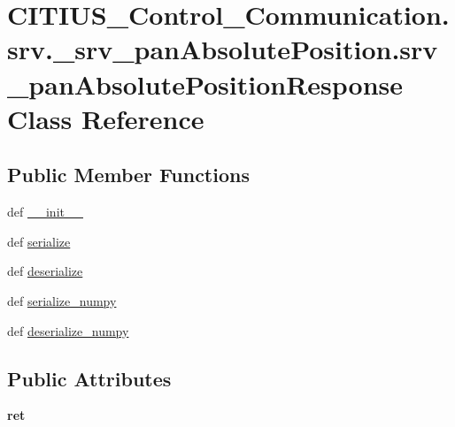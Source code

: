 \hypertarget{class_c_i_t_i_u_s___control___communication_1_1srv_1_1__srv__pan_absolute_position_1_1srv__pan_absolute_position_response}{\section{\-C\-I\-T\-I\-U\-S\-\_\-\-Control\-\_\-\-Communication.\-srv.\-\_\-srv\-\_\-pan\-Absolute\-Position.\-srv\-\_\-pan\-Absolute\-Position\-Response \-Class \-Reference}
\label{class_c_i_t_i_u_s___control___communication_1_1srv_1_1__srv__pan_absolute_position_1_1srv__pan_absolute_position_response}
}
\subsection*{\-Public \-Member \-Functions}
\begin{DoxyCompactItemize}
\item 
def \hyperlink{class_c_i_t_i_u_s___control___communication_1_1srv_1_1__srv__pan_absolute_position_1_1srv__pan_absolute_position_response_a27ee502fa522bbc0906ffab288a1d3a3}{\-\_\-\-\_\-init\-\_\-\-\_\-}
\item 
def \hyperlink{class_c_i_t_i_u_s___control___communication_1_1srv_1_1__srv__pan_absolute_position_1_1srv__pan_absolute_position_response_aeb764ea7ad52565cc28db9754ad9a988}{serialize}
\item 
def \hyperlink{class_c_i_t_i_u_s___control___communication_1_1srv_1_1__srv__pan_absolute_position_1_1srv__pan_absolute_position_response_a7d0586028ab4e250ec6ee920d93b2f6f}{deserialize}
\item 
def \hyperlink{class_c_i_t_i_u_s___control___communication_1_1srv_1_1__srv__pan_absolute_position_1_1srv__pan_absolute_position_response_a25a98793e52728a87a0f11b04f08dac2}{serialize\-\_\-numpy}
\item 
def \hyperlink{class_c_i_t_i_u_s___control___communication_1_1srv_1_1__srv__pan_absolute_position_1_1srv__pan_absolute_position_response_a82d0c4a2a93ee886bf93b26c2ca6ec3c}{deserialize\-\_\-numpy}
\end{DoxyCompactItemize}
\subsection*{\-Public \-Attributes}
\begin{DoxyCompactItemize}
\item 
\hypertarget{class_c_i_t_i_u_s___control___communication_1_1srv_1_1__srv__pan_absolute_position_1_1srv__pan_absolute_position_response_adf934a5414dd7298d04d7e34ddb9b61d}{{\bfseries ret}}\label{class_c_i_t_i_u_s___control___communication_1_1srv_1_1__srv__pan_absolute_position_1_1srv__pan_absolute_position_response_adf934a5414dd7298d04d7e34ddb9b61d}

\end{DoxyCompactItemize}
